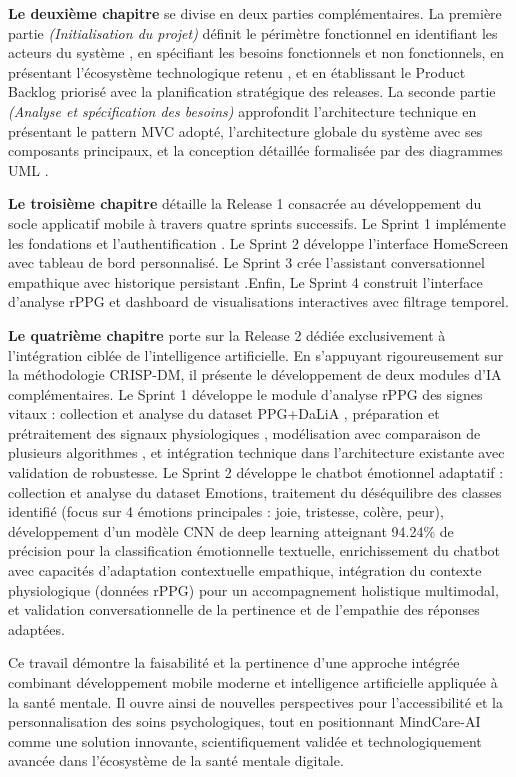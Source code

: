 \textbf{Le deuxième chapitre} se divise en deux parties complémentaires. La première partie \textit{(Initialisation du projet)} définit le périmètre fonctionnel en identifiant les acteurs du système , en spécifiant les besoins fonctionnels et non fonctionnels, en présentant l'écosystème technologique retenu , et en établissant le Product Backlog priorisé avec la planification stratégique des releases. La seconde partie \textit{(Analyse et spécification des besoins)} approfondit l'architecture technique en présentant le pattern MVC adopté, l'architecture globale du système avec ses composants principaux, et la conception détaillée formalisée par des diagrammes UML .

\textbf{Le troisième chapitre} détaille la Release 1 consacrée au développement du socle applicatif mobile à travers quatre sprints successifs. Le Sprint 1 implémente les fondations et l'authentification . Le Sprint 2 développe l'interface HomeScreen avec tableau de bord personnalisé. Le Sprint 3 crée l'assistant conversationnel empathique avec historique persistant .Enfin, Le Sprint 4 construit l'interface d'analyse rPPG  et dashboard de visualisations interactives avec filtrage temporel.

\textbf{Le quatrième chapitre} porte sur la Release 2 dédiée exclusivement à l'intégration ciblée de l'intelligence artificielle. En s'appuyant rigoureusement sur la méthodologie CRISP-DM, il présente le développement de deux modules d'IA complémentaires. Le Sprint 1 développe le module d'analyse rPPG des signes vitaux : collection et analyse du dataset PPG+DaLiA , préparation et prétraitement des signaux physiologiques , modélisation avec comparaison de plusieurs algorithmes , et intégration technique dans l'architecture existante avec validation de robustesse. Le Sprint 2 développe le chatbot émotionnel adaptatif : collection et analyse du dataset Emotions, traitement du déséquilibre des classes identifié (focus sur 4 émotions principales : joie, tristesse, colère, peur), développement d'un modèle CNN de deep learning atteignant 94.24\% de précision pour la classification émotionnelle textuelle, enrichissement du chatbot avec capacités d'adaptation contextuelle empathique, intégration du contexte physiologique (données rPPG) pour un accompagnement holistique multimodal, et validation conversationnelle de la pertinence et de l'empathie des réponses adaptées.

Ce travail démontre la faisabilité et la pertinence d'une approche intégrée combinant développement mobile moderne et intelligence artificielle appliquée à la santé mentale. Il ouvre ainsi de nouvelles perspectives pour l'accessibilité et la personnalisation des soins psychologiques, tout en positionnant MindCare-AI comme une solution innovante, scientifiquement validée et technologiquement avancée dans l'écosystème de la santé mentale digitale.
